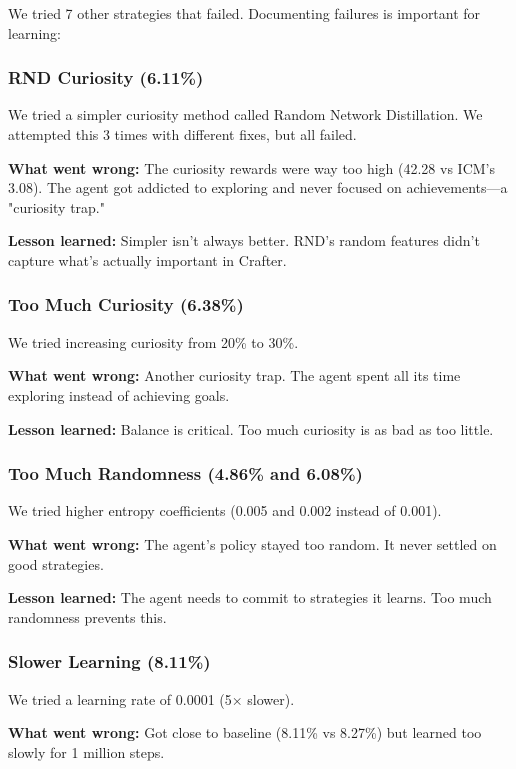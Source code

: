 \documentclass[conference]{IEEEtran}
\begin{document}
We tried 7 other strategies that failed. Documenting failures is important for learning:

\subsubsection{RND Curiosity (6.11\%)}

We tried a simpler curiosity method called Random Network Distillation. We attempted this 3 times with different fixes, but all failed.

\textbf{What went wrong:} The curiosity rewards were way too high (42.28 vs ICM's 3.08). The agent got addicted to exploring and never focused on achievements—a "curiosity trap."

\textbf{Lesson learned:} Simpler isn't always better. RND's random features didn't capture what's actually important in Crafter.

\subsubsection{Too Much Curiosity (6.38\%)}

We tried increasing curiosity from 20\% to 30\%.

\textbf{What went wrong:} Another curiosity trap. The agent spent all its time exploring instead of achieving goals.

\textbf{Lesson learned:} Balance is critical. Too much curiosity is as bad as too little.

\subsubsection{Too Much Randomness (4.86\% and 6.08\%)}

We tried higher entropy coefficients (0.005 and 0.002 instead of 0.001).

\textbf{What went wrong:} The agent's policy stayed too random. It never settled on good strategies.

\textbf{Lesson learned:} The agent needs to commit to strategies it learns. Too much randomness prevents this.

\subsubsection{Slower Learning (8.11\%)}

We tried a learning rate of 0.0001 (5× slower).

\textbf{What went wrong:} Got close to baseline (8.11\% vs 8.27\%) but learned too slowly for 1 million steps.
\end{document}
